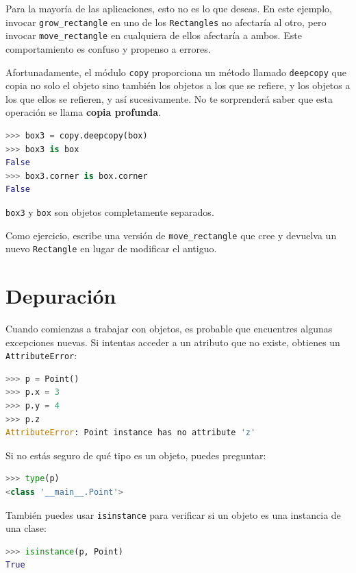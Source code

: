 Para la mayoría de las aplicaciones, esto no es lo que deseas. En este ejemplo, invocar \texttt{grow\_rectangle} en uno de los \texttt{Rectangles} no afectaría al otro, pero invocar \texttt{move\_rectangle} en cualquiera de ellos afectaría a ambos. Este comportamiento es confuso y propenso a errores.

Afortunadamente, el módulo \texttt{copy} proporciona un método llamado \texttt{deepcopy} que copia no solo el objeto sino también los objetos a los que se refiere, y los objetos a los que ellos se refieren, y así sucesivamente. No te sorprenderá saber que esta operación se llama \textbf{copia profunda}.

\begin{lstlisting}[language=Python]
>>> box3 = copy.deepcopy(box)
>>> box3 is box
False
>>> box3.corner is box.corner
False
\end{lstlisting}

\texttt{box3} y \texttt{box} son objetos completamente separados.

Como ejercicio, escribe una versión de \texttt{move\_rectangle} que cree y devuelva un nuevo \texttt{Rectangle} en lugar de modificar el antiguo.

\section{Depuración}

Cuando comienzas a trabajar con objetos, es probable que encuentres algunas excepciones nuevas. Si intentas acceder a un atributo que no existe, obtienes un \texttt{AttributeError}:

\begin{lstlisting}[language=Python]
>>> p = Point()
>>> p.x = 3
>>> p.y = 4
>>> p.z
AttributeError: Point instance has no attribute 'z'
\end{lstlisting}

Si no estás seguro de qué tipo es un objeto, puedes preguntar:

\begin{lstlisting}[language=Python]
>>> type(p)
<class '__main__.Point'>
\end{lstlisting}

También puedes usar \texttt{isinstance} para verificar si un objeto es una instancia de una clase:

\begin{lstlisting}[language=Python]
>>> isinstance(p, Point)
True
\end{lstlisting}

